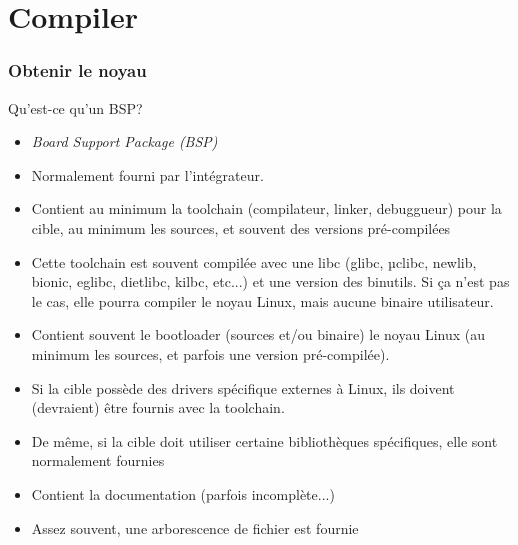 %
%
%

\part{Compiler}

\begin{frame}
  \partpage
\end{frame}

\begin{frame}
  \tableofcontents[currentpart]
\end{frame}

\section{Obtenir le noyau}

\begin{frame}[fragile=singleslide]{Qu'est-ce qu'un BSP?}
  \begin{itemize} 
  \item \emph{Board Support Package (BSP)}
  \item Normalement fourni par l'intégrateur.
  \item  Contient  au   minimum  la  toolchain  (compilateur,  linker,
    debuggueur) pour la cible, au  minimum les sources, et souvent des
    versions pré-compilées
  \item  Cette toolchain est  souvent compilée  avec une  libc (glibc,
    µclibc, newlib,  bionic, eglibc,  dietlibc, kilbc, etc...)  et une
    version des binutils. Si ça n'est pas le cas, elle pourra compiler
    le noyau Linux, mais aucune binaire utilisateur.
  \item  Contient souvent  le  bootloader (sources  et/ou binaire)  le
    noyau  Linux  (au minimum  les  sources,  et  parfois une  version
    pré-compilée).
  \item Si la  cible possède des drivers spécifique  externes à Linux,
    ils doivent (devraient) être fournis avec la toolchain.
  \item  De même,  si la  cible doit  utiliser  certaine bibliothèques
    spécifiques, elle sont normalement fournies
  \item Contient la documentation (parfois incomplète...)
  \item Assez souvent, une arborescence de fichier est fournie
\end{itemize} 
\end{frame} 



